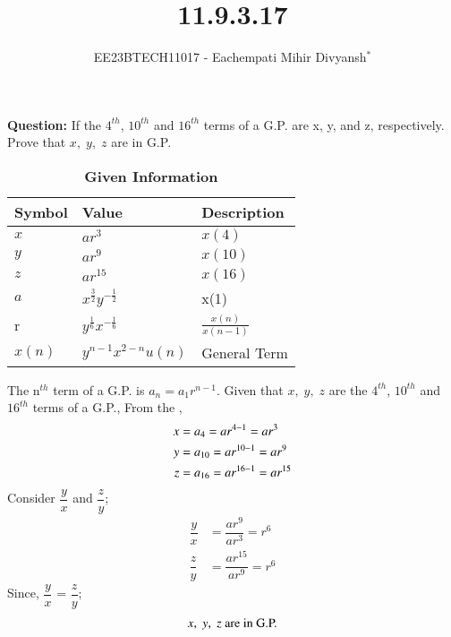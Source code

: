 \documentclass[journal,12pt,twocolumn]{IEEEtran}
\theoremstyle{remark}
\begin{document}

\vspace{3cm}

\title{11.9.3.17}
\author{EE23BTECH11017 - Eachempati Mihir Divyansh$^{*}$%
}
\maketitle
\newpage
\bigskip

\renewcommand{\thefigure}{\theenumi}
\renewcommand{\thetable}{\theenumi}

\textbf{Question: }
If the $4^{th}$, $10^{th}$ and $16^{th}$ terms of a G.P. are x, y, and z, respectively. Prove that $x,\; y,\; z$ are in G.P.

\begin{table}[h]
    \centering
        \caption{\textbf{Given Information}}
    \begin{tabular}{|m{2cm}|m{2cm}|m{2cm}|}
    \hline
    \textbf{Symbol} & \textbf{Value} & \textbf{Description}\\ [1ex]
    \hline
        $x$ & $ar^3$ & $x(4)$ \\ [1ex]
    \hline
        $y$ & $ar^9$ & $x(10)$\\ [1ex]
    \hline
        $z$ & $ar^{15}$ & $x(16)$\\ [1ex]
    \hline
        $a$ & $x^{\frac{3}{2}}y^{-\frac{1}{2}}$ & x(1) \\[1ex]
    \hline
        r & $y^{\frac{1}{6}}x^{-\frac{1}{6}}$ & $\frac{x(n)}{x(n-1)}$\\[1ex]
    \hline \vspace{0.1cm}
        $x(n)$ & $y^{n-1} x^{2-n} u(n)$ & General Term \\ [1ex]
    \hline
    \end{tabular}
\end{table} \label{table}

\solution


The n$^{th}$ term of a G.P. is $a_n=a_1r^{n-1}$. Given that $x,\; y,\; z$ are the $4^{th}$, $10^{th}$ and $16^{th}$ terms of a G.P., From the ,
\begin{align}
\notag x&= a_4 =ar^{4-1}=ar^3 \\
\notag y&=a_{10}=ar^{10-1}=ar^9 \\
\notag z&=a_{16}=ar^{16-1}=ar^{15}
\end{align}
Consider $\dfrac{y}{x}$ and $\dfrac{z}{y}$;
\begin{align}
 \dfrac{y}{x} &= \dfrac{ar^9}{ar^3} = r^6\\ 
 \dfrac{z}{y} &= \dfrac{ar^{15}}{ar^9} = r^6
\end{align}
Since, $\dfrac{y}{x}$ = $\dfrac{z}{y}$;\\
\begin{align}  
\notag    x,\; y,\; z \text{ are in G.P.}
\end{align}
\end{document}
